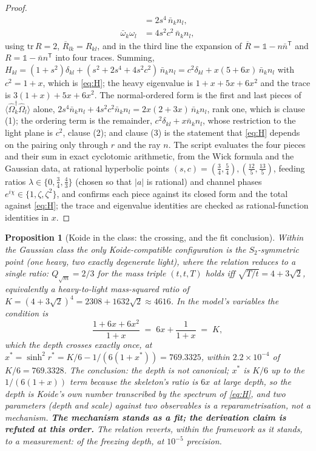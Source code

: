 \documentclass[11pt]{article}
\newtheorem{proposition}[theorem]{Proposition}
\theoremstyle{definition}
\begin{document}
\begin{proof}
\begin{align*}
&= 2s^{4}\,\bar{n}_{k}n_{l},\\
\bar\omega_{k}\omega_{l} &= 4s^{2}c^{2}\,\bar{n}_{k}n_{l},
\end{align*}
using $\mathrm{tr}\,R = 2$, $\overline{R}_{lk} = R_{kl}$, and in the third line the expansion of $\overline{R} = \mathbb{1} - n\bar{n}^{\mathsf{T}}$ and $R = \mathbb{1} - \bar{n}n^{\mathsf{T}}$ into four traces. Summing, $H_{kl} = (1 + s^{2})\delta_{kl} + (s^{2} + 2s^{4} + 4s^{2}c^{2})\,\bar{n}_{k}n_{l} = c^{2}\delta_{kl} + x(5 + 6x)\,\bar{n}_{k}n_{l}$ with $c^{2} = 1 + x$, which is \eqref{eq:H}; the heavy eigenvalue is $1 + x + 5x + 6x^{2}$ and the trace is $3(1+x) + 5x + 6x^{2}$. The normal-ordered form is the first and last pieces of $\langle\hat\Omega_{k}^{\dagger}\hat\Omega_{l}\rangle$ alone, $2s^{4}\bar{n}_{k}n_{l} + 4s^{2}c^{2}\bar{n}_{k}n_{l} = 2x(2+3x)\,\bar{n}_{k}n_{l}$, rank one, which is clause (1); the ordering term is the remainder, $c^{2}\delta_{kl} + x\bar{n}_{k}n_{l}$, whose restriction to the light plane is $c^{2}$, clause (2); and clause (3) is the statement that \eqref{eq:H} depends on the pairing only through $r$ and the ray $n$. The script evaluates the four pieces and their sum in exact cyclotomic arithmetic, from the Wick formula and the Gaussian data, at rational hyperbolic points $(s, c) = (\tfrac34, \tfrac54), (\tfrac{12}{5}, \tfrac{13}{5})$, feeding ratios $\lambda \in \{0, \tfrac34, \tfrac43\}$ (chosen so that $|a|$ is rational) and channel phases $e^{i\chi} \in \{1, \zeta, \zeta^{2}\}$, and confirms each piece against its closed form and the total against \eqref{eq:H}; the trace and eigenvalue identities are checked as rational-function identities in $x$.
\end{proof}

\begin{proposition}[Koide in the class: the crossing, and the fit conclusion]\label{prop:crossing}
Within the Gaussian class the only Koide-compatible configuration is the $S_{2}$-symmetric point (one heavy, two exactly degenerate light), where the relation reduces to a single ratio: $Q_{\sqrt{m}} = 2/3$ for the mass triple $(t, t, T)$ holds iff $\sqrt{T/t} = 4 + 3\sqrt{2}$, equivalently a heavy-to-light mass-squared ratio of $K = (4+3\sqrt{2})^{4} = 2308 + 1632\sqrt{2} \approx 4616$. In the model's variables the condition is
\begin{equation}\label{eq:crossing}
\frac{1 + 6x + 6x^{2}}{1 + x} \;=\; 6x + \frac{1}{1+x} \;=\; K,
\end{equation}
which the depth crosses exactly once, at $x^{*} = \sinh^{2}r^{*} = K/6 - 1/(6(1 + x^{*})) = 769.3325$, within $2.2 \times 10^{-4}$ of $K/6 = 769.3328$. The conclusion: the depth is not canonical; $x^{*}$ is $K/6$ up to the $1/(6(1+x))$ term because the skeleton's ratio is $6x$ at large depth, so the depth is Koide's own number transcribed by the spectrum of \eqref{eq:H}, and two parameters (depth and scale) against two observables is a reparametrisation, not a mechanism. \textbf{The mechanism stands as a fit; the derivation claim is refuted at this order.} The relation reverts, within the framework as it stands, to a measurement: of the freezing depth, at $10^{-5}$ precision.
\end{proposition}
\end{document}
